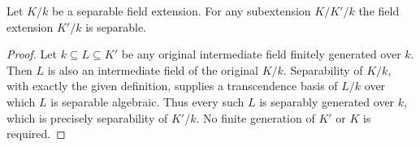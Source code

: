 \begin{lemma}
\label{lemma-subextensions-are-separable}
Let $K/k$ be a separable field extension.
For any subextension $K/K'/k$ the field
extension $K'/k$ is separable.
\end{lemma}

\begin{proof}
Let $k\subseteq L\subseteq K'$ be any original
intermediate field finitely generated over $k$.
Then $L$ is also an intermediate field of the
original $K/k$. Separability of $K/k$, with
exactly the given definition, supplies a
transcendence basis of $L/k$ over which $L$
is separable algebraic. Thus every such $L$
is separably generated over $k$, which is
precisely separability of $K'/k$. No finite
generation of $K'$ or $K$ is required.
\end{proof}